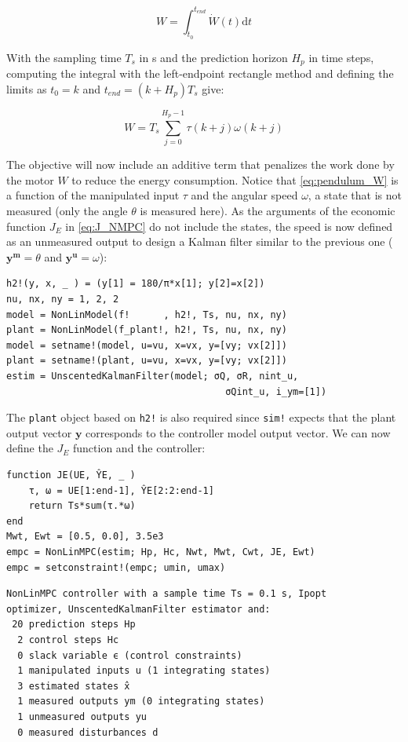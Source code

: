 \begin{equation}
W = \int_{t_0}^{t_{end}} \dot{W}(t) \mathrm{d}t 
\end{equation}

With the sampling time $T_s$ in \si{\second} and the prediction horizon $H_p$ in time steps, computing the integral with the left-endpoint rectangle method and defining the limits as $t_0=k$ and $t_{end} = (k + H_p) T_s$ give:

\begin{equation}\label{eq:pendulum_W}
W = T_s \sum_{j = 0}^{H_p - 1} \tau(k+j) \omega(k+j) 
\end{equation}

The objective will now include an additive term that penalizes the work done by the motor $W$ to reduce the energy consumption. Notice that \eqref{eq:pendulum_W} is a function of the manipulated input $\tau$ and the angular speed $\omega$, a state that is not measured (only the angle $\theta$ is measured here). As the arguments of the economic function $J_E$ in \eqref{eq:J_NMPC} do not include the states, the speed is now defined as an unmeasured output to design a Kalman filter similar to the previous one ($\mathbf{y^m} = \theta$ and $\mathbf{y^u} = \omega$): 

\begin{verbatim}
h2!(y, x, _ ) = (y[1] = 180/π*x[1]; y[2]=x[2])
nu, nx, ny = 1, 2, 2
model = NonLinModel(f!      , h2!, Ts, nu, nx, ny)
plant = NonLinModel(f_plant!, h2!, Ts, nu, nx, ny)
model = setname!(model, u=vu, x=vx, y=[vy; vx[2]])
plant = setname!(plant, u=vu, x=vx, y=[vy; vx[2]])
estim = UnscentedKalmanFilter(model; σQ, σR, nint_u, 
                                       σQint_u, i_ym=[1])
\end{verbatim}

The \texttt{plant} object based on \texttt{h2!} is also required since \texttt{sim!} expects that the plant output vector $\mathbf{y}$ corresponds to the controller model output vector. We can now define the $J_E$ function and the controller:

\begin{verbatim}
function JE(UE, ŶE, _ )
    τ, ω = UE[1:end-1], ŶE[2:2:end-1]
    return Ts*sum(τ.*ω)
end
Mwt, Ewt = [0.5, 0.0], 3.5e3
empc = NonLinMPC(estim; Hp, Hc, Nwt, Mwt, Cwt, JE, Ewt)
empc = setconstraint!(empc; umin, umax)
\end{verbatim}
\spacerepl
\begin{verbatim}
NonLinMPC controller with a sample time Ts = 0.1 s, Ipopt
optimizer, UnscentedKalmanFilter estimator and:
 20 prediction steps Hp
  2 control steps Hc
  0 slack variable ϵ (control constraints)
  1 manipulated inputs u (1 integrating states)
  3 estimated states x̂
  1 measured outputs ym (0 integrating states)
  1 unmeasured outputs yu
  0 measured disturbances d
\end{verbatim}

